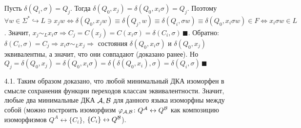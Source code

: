 \documentclass[a4paper]{article}
\def\A{{\cal A}}
\def\B{{\cal B}}
\begin{document}
\begin{enumerate}[1.]
Пусть $\delta(Q_i,\sigma)=Q_j$. Тогда $\delta(Q_0,x_j)=\delta(Q_0,x_i\sigma)=Q_j$. Поэтому $\forall w\in \Sigma^*\hookrightarrow L\ni x_jw\Leftrightarrow \delta(Q_0,x_jw)\equiv\delta(Q_j,w)\equiv\delta(Q_i,\sigma w)\equiv\delta(Q_0,x_i\sigma w)\in F\Leftrightarrow x_i\sigma w\in L$. Значит, $x_j\sim_L x_i\sigma\Rightarrow C_j=C(x_j)=C(x_i\sigma)=\delta(C_i,\sigma)\,\blacksquare$.\newline
Обратно: $\delta(C_i,\sigma)=C_j\Rightarrow x_i\sigma\sim_L x_j\Rightarrow$ состояния $\delta(Q_0,x_i\sigma)$ и $\delta(Q_0,x_j)$ эквивалентны, а значит, что они совпадают (доказано ранее). Но $Q_j=\delta(Q_0,x_j)=\delta(Q_0,x_i\sigma)=\delta(\delta(Q_0,x_i),\sigma)=\delta(Q_i,\sigma)\,\blacksquare$
\item [4.1.] Таким образом доказано, что любой минимальный ДКА изоморфен в смысле сохранения функции переходов классам эквивалентности. Значит, любые два минимальные ДКА $\A,\B$ для данного языка изоморфны между собой (можно построить изоморфизм $\varphi_{\A,\B}\colon Q^\A\leftrightarrow Q^\B$ как композицию изоморфизмов $Q^A\leftrightarrow \{C_i\}$, $\{C_i\}\leftrightarrow Q^\B$).
\end{enumerate}
\end{document}
